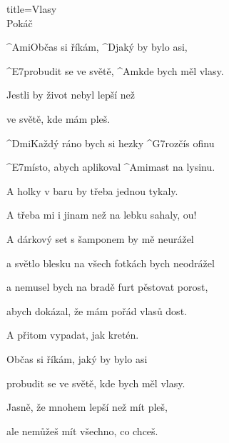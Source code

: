 \begin{song}{title=\predtitle\centering Vlasy\\\large Pokáč \vspace*{-0.3cm}}  %
\begin{centerjustified}


	^{Ami}Občas si říkám, ^{\z D}jaký by bylo asi,

	^{E7\z}probudit se ve světě, ^{Am}kde bych měl vlasy.

	Jestli by život nebyl lepší než

	ve světě, kde mám pleš.

\sloka
	^{Dmi\z}Každý ráno bych si hezky ^{G7\z}rozčís ofinu

	^{E7\z}místo, abych aplikoval ^{Ami\z}mast na lysinu.

	A holky v baru by třeba jednou tykaly.

	A třeba mi i jinam než na lebku sahaly, ou!

\sloka
	A dárkový set s šamponem by mě neurážel

	a světlo blesku na všech fotkách bych neodrážel

	a nemusel bych na bradě furt pěstovat porost,

	abych dokázal, že mám pořád vlasů dost.

	A přitom vypadat, jak kretén.

	Občas si říkám, jaký by bylo asi

	probudit se ve světě, kde bych měl vlasy.

	Jasně, že mnohem lepší než mít pleš,

	ale nemůžeš mít všechno, co chceš.

\end{centerjustified}
\setcounter{Slokočet}{0}
\end{song}

